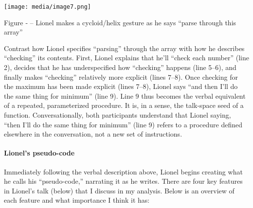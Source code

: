 \texttt{[image: media/image7.png]}

\protect\hypertarget{ux5fToc252445970}{}{}Figure ‑ -- Lionel makes a
cycloid/helix gesture as he says ``parse through this array''

Contrast how Lionel specifies ``parsing'' through the array with how he
describes ``checking'' its contents. First, Lionel explains that he'll
``check each number'' (line 2), decides that he has underspecified how
``checking'' happens (line 5--6), and finally makes ``checking''
relatively more explicit (lines 7--8). Once checking for the maximum has
been made explicit (lines 7--8), Lionel says ``and then I'll do the same
thing for minimum'' (line 9). Line 9 thus becomes the verbal equivalent
of a repeated, parameterized procedure. It is, in a sense, the
talk-space seed of a function. Conversationally, both participants
understand that Lionel saying, ``then I'll do the same thing for
minimum'' (line 9) refers to a procedure defined elsewhere in the
conversation, not a new set of instructions.

\paragraph{Lionel's pseudo-code}\label{lionels-pseudo-code}

Immediately following the verbal description above, Lionel begins
creating what he calls his ``pseudo-code,'' narrating it as he writes.
There are four key features in Lionel's talk (below) that I discuss in
my analysis. Below is an overview of each feature and what importance I
think it has:

